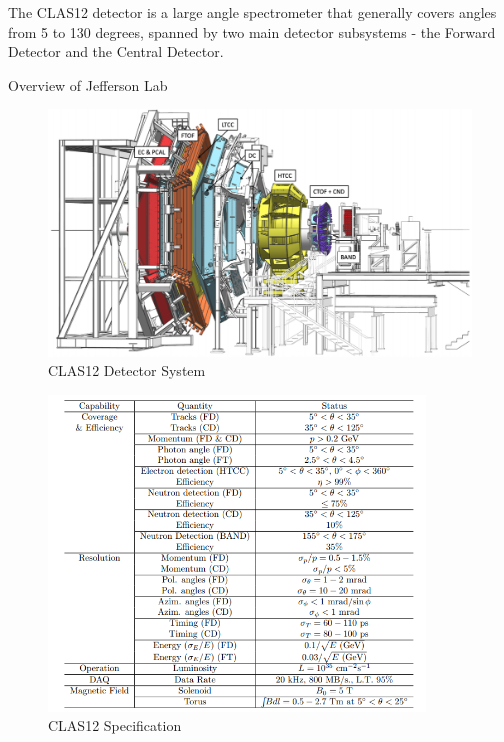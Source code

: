    The CLAS12 detector is a large angle spectrometer that generally covers angles from 5 to 130 degrees, spanned by two main detector subsystems - the Forward Detector and the Central Detector.

    Overview of Jefferson Lab
        
    \begin{figure}[H]
        \centering
        \includegraphics[width=12cm]{Chapters/Ch2-Experiment/clas-12-system/pics/other/CLA12.PNG}
        \caption{ CLAS12 Detector System }
    \end{figure}
    
    \begin{figure}[H]
        \centering
        \includegraphics[width=10cm]{Chapters/Ch2-Experiment/clas-12-system/pics/other/clas12-params.PNG}
        \caption{CLAS12 Specification}
    \end{figure}

